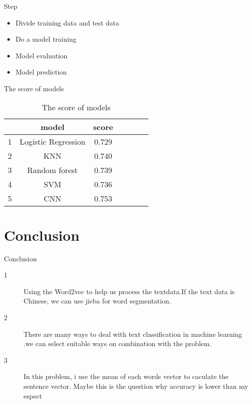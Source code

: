 \documentclass[
 size=12pt,
 paper=smartboard, %
 mode=present, %
 display=slides, %
style=tuliplab,
pauseslide,
fleqn,leqno]{powerdot}
\begin{document}
\begin{slide}[toc=,bm=]{Step}
\begin{itemize}
  \item Divide training data and test data
  \item Do a model training
  \item Model evaluation
  \item Model prediction
\end{itemize}
\end{slide}

\begin{slide}[toc=,bm=]{The score of models}
  \begin{table}[htbp]  \centering
    \caption{The score of  models}
    \label{tbl:data information}
    \begin{tabular}{ccccccc}
      \hline
        & model          & score \\
      \hline
      1 &  Logistic Regression  & 0.729  \\
      2 &  KNN                  & 0.740  \\
      3 &  Random forest        & 0.739  \\
      4 &  SVM                  & 0.736  \\
      5 &  CNN                  & 0.753  \\
      \hline 
    \end{tabular}
  \end{table}
\end{slide}

\section{Conclusion}
\begin{slide}[toc=,bm=]{Conclusion}
\begin{description}
  \item[1] Using the Word2vec to help us process the textdata.If the text data is Chinese, we can use jieba for word segmentation.
  \item[2] There are many ways to deal with text classification in machine learning .we can select suitable ways on combination with the problem.
  \item[3] In this problem, i use the mean of each words vector to caculate the sentence vector. Maybe this is the question why accuracy is lower than my espect  
\end{description}
\end{slide}
\end{document}
